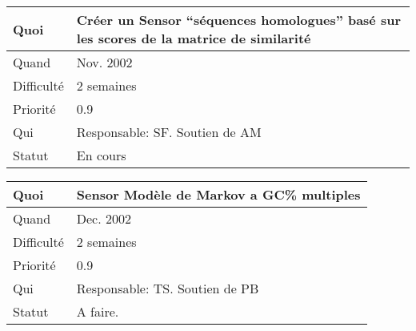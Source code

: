 \documentclass[a4paper,11pt]{article}
\begin{document}
\begin{longtable}{|l|p{7cm}|}\hline
  Quoi & Cr\'eer un Sensor ``s\'equences homologues'' bas\'e sur les scores
  de la matrice de similarit\'e \\\hline
  Quand  & Nov. 2002 \\\hline
  Difficult\'e &  2 semaines\\\hline
  Priorit\'e &  0.9 \\\hline
  Qui & Responsable: SF. Soutien de AM\\\hline
  Statut & En cours\\\hline
\end{longtable}

\begin{longtable}{|l|p{7cm}|}\hline
  Quoi & Sensor Mod\`ele de Markov a GC\% multiples\\\hline
  Quand  &  Dec. 2002 \\\hline
  Difficult\'e &  2 semaines \\\hline
  Priorit\'e &  0.9 \\\hline
  Qui & Responsable: TS. Soutien de PB\\\hline
  Statut & A faire.\\\hline
\end{longtable}
\end{document}
